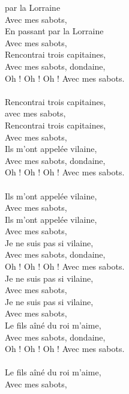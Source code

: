 
 par la Lorraine
\\Avec mes sabots,
\\En passant par la Lorraine
\\Avec mes sabots,
\\Rencontrai trois capitaines,
\\Avec mes sabots, dondaine,
\\Oh ! Oh ! Oh ! Avec mes sabots.
\\\\Rencontrai trois capitaines,
\\avec mes sabots,
\\Rencontrai trois capitaines,
\\Avec mes sabots,
\\Ils m'ont appelée vilaine,
\\Avec mes sabots, dondaine,
\\Oh ! Oh ! Oh ! Avec mes sabots.
\\\\Ils m'ont appelée vilaine,
\\Avec mes sabots,
\\Ils m'ont appelée vilaine,
\\Avec mes sabots,
\\Je ne suis pas si vilaine,
\\Avec mes sabots, dondaine,
\\Oh ! Oh ! Oh ! Avec mes sabots.
\\Je ne suis pas si vilaine,
\\Avec mes sabots,
\\Je ne suis pas si vilaine,
\\Avec mes sabots,
\\Le fils aîné du roi m'aime,
\\Avec mes sabots, dondaine,
\\Oh ! Oh ! Oh ! Avec mes sabots.
\\\\Le fils aîné du roi m'aime,
\\Avec mes sabots,
